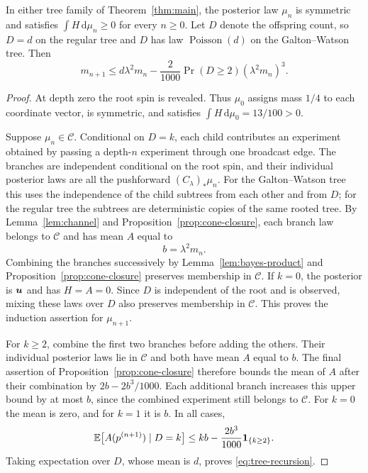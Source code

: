 \begin{proposition}
\label{prop:tree-recursion}
In either tree family of Theorem~\ref{thm:main}, the posterior law
$\mu_n$ is symmetric and satisfies $\int H\,\mathrm d\mu_n\ge0$ for
every $n\ge0$.  Let $D$ denote the offspring count, so $D=d$ on the
regular tree and $D$ has law $\operatorname{Poisson}(d)$ on the
Galton--Watson tree.  Then
\begin{equation}
  m_{n+1}\le d\lambda^2m_n
     -\frac{2}{1000}\Pr(D\ge2)(\lambda^2m_n)^3.
  \label{eq:tree-recursion}
\end{equation}
\end{proposition}

\begin{proof}
At depth zero the root spin is revealed.  Thus $\mu_0$ assigns mass
$1/4$ to each coordinate vector, is symmetric, and satisfies
$\int H\,\mathrm d\mu_0=13/100>0$.

Suppose $\mu_n\in\mathcal C$.
Conditional on $D=k$, each child contributes an experiment obtained by
passing a depth-$n$ experiment through one broadcast edge.  The branches
are independent conditional on the root spin, and their individual
posterior laws are all the pushforward $(C_\lambda)_*\mu_n$.  For the
Galton--Watson tree this uses the independence of the child subtrees
from each other and from $D$; for the regular tree the subtrees are
deterministic copies of the same rooted tree.  By
Lemma~\ref{lem:channel} and Proposition~\ref{prop:cone-closure}, each
branch law belongs to $\mathcal C$ and has mean $A$ equal to
\[
  b=\lambda^2m_n.
\]
Combining the branches successively by Lemma~\ref{lem:bayes-product}
and Proposition~\ref{prop:cone-closure} preserves membership in
$\mathcal C$.  If $k=0$, the posterior is $\boldsymbol u$ and has $H=A=0$.
Since $D$ is independent of the root and is observed, mixing these laws
over $D$ also preserves membership in $\mathcal C$.  This proves
the induction assertion for $\mu_{n+1}$.

For $k\ge2$, combine the first two branches before adding the others.
Their individual posterior laws lie in $\mathcal C$ and both have mean
$A$ equal to $b$.  The final assertion of
Proposition~\ref{prop:cone-closure} therefore bounds the mean of $A$
after their combination by $2b-2b^3/1000$.  Each additional branch
increases this upper bound by at most $b$, since the combined experiment
still belongs to $\mathcal C$.  For $k=0$ the mean is zero, and for $k=1$ it is
$b$.  In all cases,
\[
  \mathbb E\bigl[A(p^{(n+1)})\mid D=k\bigr]
  \le kb-\frac{2b^3}{1000}\boldsymbol{1}_{\{k\ge2\}}.
\]
Taking expectation over $D$, whose mean is $d$, proves
\eqref{eq:tree-recursion}.
\end{proof}

